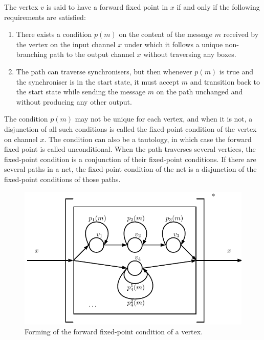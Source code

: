 \begin{definition}The vertex $v$ is said to have a forward fixed point in $x$ if and only if the following requirements are satisfied:

\begin{enumerate}
\item There exists a condition $p(m)$ on the content of the message $m$ received by the vertex on the input channel $x$ under which it follows a unique non-branching path to the output channel $x$ without traversing any boxes.

\item The path can traverse synchronisers, but then whenever $p(m)$ is true and the synchroniser is in the start state, it must accept $m$ and transition back to the start state while sending the message $m$ on the path unchanged and without producing any other output.

\end{enumerate}
\end{definition}

The condition $p(m)$ may not be unique for each vertex, and when it is not, a disjunction of all such conditions is called the fixed-point condition of the vertex on channel $x$. The condition can also be a tautology, in which case the forward fixed point is called unconditional. When the path traverses several vertices, the fixed-point condition is a conjunction of their fixed-point conditions. If there are several paths in a net, the fixed-point condition of the net is a disjunction of the fixed-point conditions of those paths.

  \begin{figure}[h!]
  \centering
  \includegraphics{figs/chapter_04_ffp.pdf}
  \caption{Forming of the forward fixed-point condition of a vertex.}
  \label{fig:ffp}
  \end{figure}


